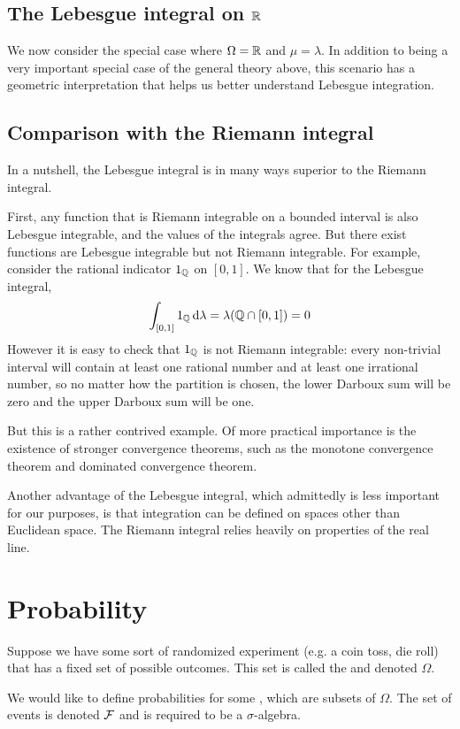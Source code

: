 \documentclass{article}
\begin{document}
\subsection{The Lebesgue integral on $\mathbb{R}$}
We now consider the special case where $\Omega = \mathbb{R}$ and $\mu = \lambda$.
In addition to being a very important special case of the general theory above, this scenario has a geometric interpretation that helps us better understand Lebesgue integration.

\subsection{Comparison with the Riemann integral}
In a nutshell, the Lebesgue integral is in many ways superior to the Riemann integral.

First, any function that is Riemann integrable on a bounded interval is also Lebesgue integrable, and the values of the integrals agree.
But there exist functions are Lebesgue integrable but not Riemann integrable.
For example, consider the rational indicator $1_{\mathbb{Q}}$ on $[0,1]$.
We know that for the Lebesgue integral,
\[\int_{[0,1]} 1_{\mathbb{Q}}\dd{\lambda} = \lambda(\mathbb{Q} \cap [0,1]) = 0\]
However it is easy to check that $1_{\mathbb{Q}}$ is not Riemann integrable: every non-trivial interval will contain at least one rational number and at least one irrational number, so no matter how the partition is chosen, the lower Darboux sum will be zero and the upper Darboux sum will be one.

But this is a rather contrived example.
Of more practical importance is the existence of stronger convergence theorems, such as the monotone convergence theorem and dominated convergence theorem.

Another advantage of the Lebesgue integral, which admittedly is less important for our purposes, is that integration can be defined on spaces other than Euclidean space.
The Riemann integral relies heavily on properties of the real line.

\section{Probability}
Suppose we have some sort of randomized experiment (e.g. a coin toss, die roll) that has a fixed set of possible outcomes.
This set is called the  and denoted $\Omega$.

We would like to define probabilities for some , which are subsets of $\Omega$.
The set of events is denoted $\mathcal{F}$ and is required to be a $\sigma$-algebra.
\end{document}

